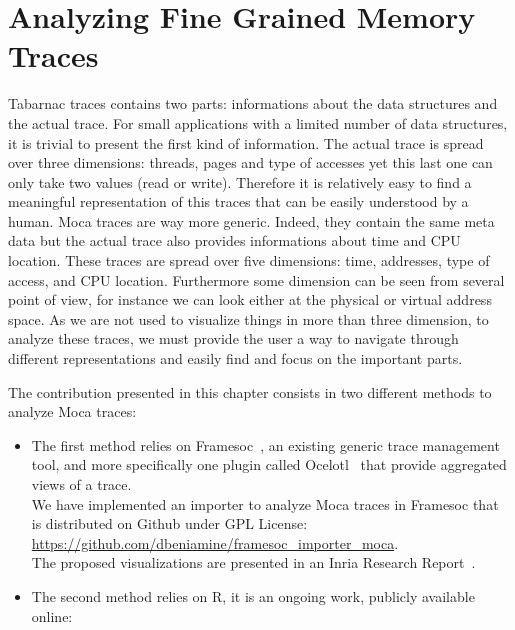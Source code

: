 \chapter{Analyzing Fine Grained Memory Traces}

\gls{Tabarnac} traces contains two parts: informations about the data structures and the actual trace.
For small applications with a limited number of data structures, it is trivial to present the first kind of information.
The actual trace is spread over three dimensions: threads, pages and type of accesses yet this last one can only take two values (read or write).
Therefore it is relatively easy to find a meaningful representation of this traces that can be easily understood by a human.
\gls{Moca} traces are way more generic.
Indeed, they contain the same meta data but the actual trace also provides informations about time and \gls{CPU} location.
These traces are spread over five dimensions: time, addresses, type of access, and \gls{CPU} location.
Furthermore some dimension can be seen from several point of view, for instance we can look either at the physical or virtual address space.
As we are not used to visualize things in more than three dimension, to analyze these traces, we must provide the user a way to navigate through different representations and easily find and focus on the important parts.

The contribution presented in this chapter consists in two different methods to analyze \gls{Moca} traces:
\begin{itemize}
    \item The first method relies on \gls{Framesoc}~\cite{Pagano14frameSoC}, an existing generic trace management tool, and more specifically one plugin called \gls{Ocelotl}~\cite{Dosimont14Ocelotl} that provide aggregated views of a trace.\\
        We have implemented an importer to analyze \gls{Moca} traces in \gls{Framesoc} that is distributed on Github under GPL License:\\
        \url{https://github.com/dbeniamine/framesoc\_importer\_moca}.\\
        The proposed visualizations are presented in an Inria Research Report~\cite{Beniamine15Memory}.
    \item The second method relies on \gls{R}, it is an ongoing work, publicly available online:
\end{itemize}

